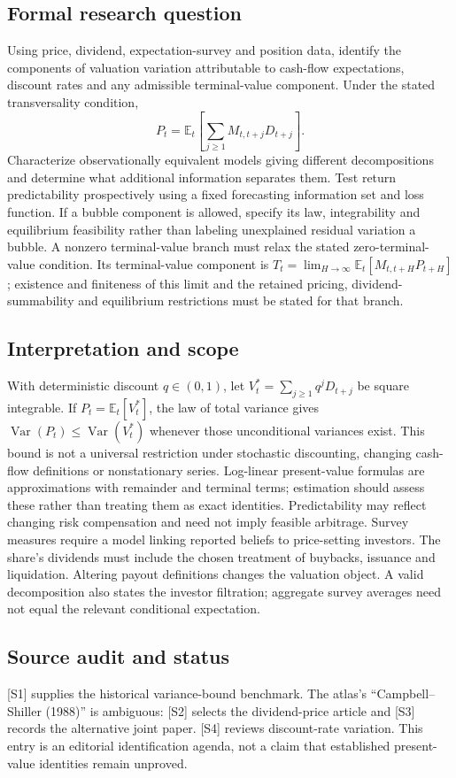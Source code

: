 \documentclass[11pt,a4paper]{article}
\begin{document}
\subsection*{Formal research question}
Using price, dividend, expectation-survey and position data, identify the components of valuation variation attributable to cash-flow expectations, discount rates and any admissible terminal-value component. Under the stated transversality condition,
\[
 P_t=\mathbb E_t\!\left[\sum_{j\ge1}M_{t,t+j}D_{t+j}\right].
\]
Characterize observationally equivalent models giving different decompositions and determine what additional information separates them. Test return predictability prospectively using a fixed forecasting information set and loss function. If a bubble component is allowed, specify its law, integrability and equilibrium feasibility rather than labeling unexplained residual variation a bubble. A nonzero terminal-value branch must relax the stated zero-terminal-value condition. Its terminal-value component is $T_t=\lim_{H\to\infty}\mathbb E_t[M_{t,t+H}P_{t+H}]$; existence and finiteness of this limit and the retained pricing, dividend-summability and equilibrium restrictions must be stated for that branch.

\subsection*{Interpretation and scope}
With deterministic discount $q\in(0,1)$, let $V_t^*=\sum_{j\ge1}q^jD_{t+j}$ be square integrable. If $P_t=\mathbb E_t[V_t^*]$, the law of total variance gives $\operatorname{Var}(P_t)\le\operatorname{Var}(V_t^*)$ whenever those unconditional variances exist. This bound is not a universal restriction under stochastic discounting, changing cash-flow definitions or nonstationary series. Log-linear present-value formulas are approximations with remainder and terminal terms; estimation should assess these rather than treating them as exact identities. Predictability may reflect changing risk compensation and need not imply feasible arbitrage. Survey measures require a model linking reported beliefs to price-setting investors. The share’s dividends must include the chosen treatment of buybacks, issuance and liquidation. Altering payout definitions changes the valuation object. A valid decomposition also states the investor filtration; aggregate survey averages need not equal the relevant conditional expectation.

\subsection*{Source audit and status}
[S1] supplies the historical variance-bound benchmark. The atlas’s ``Campbell–Shiller (1988)'' is ambiguous: [S2] selects the dividend-price article and [S3] records the alternative joint paper. [S4] reviews discount-rate variation. This entry is an editorial identification agenda, not a claim that established present-value identities remain unproved.
\end{document}
